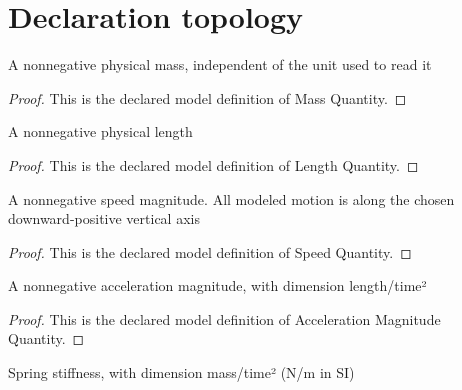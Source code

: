 \section{Declaration topology}
\begin{definition}
  \label{def:physics:phyx-mini-0765:phyxminiproblems-problemphyxmini0765-massquantity}
  A nonnegative physical mass, independent of the unit used to read it
\end{definition}
\begin{proof}
  This is the declared model definition of Mass Quantity.
\end{proof}
\begin{definition}
  \label{def:physics:phyx-mini-0765:phyxminiproblems-problemphyxmini0765-lengthquantity}
  A nonnegative physical length
\end{definition}
\begin{proof}
  This is the declared model definition of Length Quantity.
\end{proof}
\begin{definition}
  \label{def:physics:phyx-mini-0765:phyxminiproblems-problemphyxmini0765-speedquantity}
  A nonnegative speed magnitude. All modeled motion is along the chosen downward-positive vertical axis
\end{definition}
\begin{proof}
  This is the declared model definition of Speed Quantity.
\end{proof}
\begin{definition}
  \label{def:physics:phyx-mini-0765:phyxminiproblems-problemphyxmini0765-accelerationmagnitudequantity}
  A nonnegative acceleration magnitude, with dimension length/time²
\end{definition}
\begin{proof}
  This is the declared model definition of Acceleration Magnitude Quantity.
\end{proof}
\begin{definition}
  \label{def:physics:phyx-mini-0765:phyxminiproblems-problemphyxmini0765-springstiffnessquantity}
  Spring stiffness, with dimension mass/time² (N/m in SI)
\end{definition}
